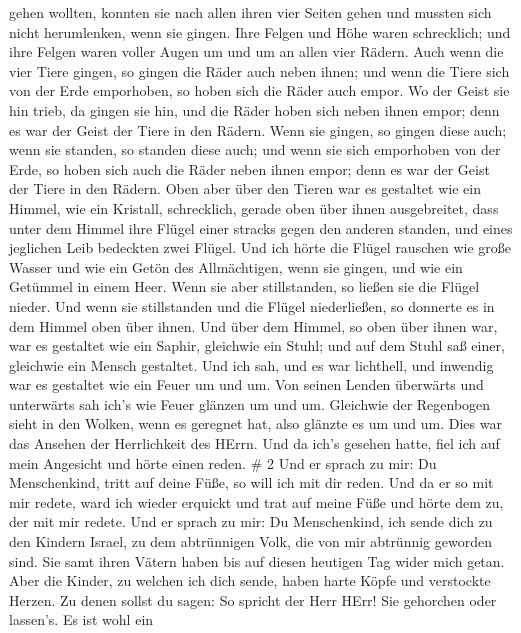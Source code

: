 gehen wollten, konnten sie nach allen ihren vier Seiten gehen und
mussten sich nicht herumlenken, wenn sie gingen.  Ihre
Felgen und Höhe waren schrecklich; und ihre Felgen waren voller Augen um
und um an allen vier Rädern.  Auch wenn die vier Tiere
gingen, so gingen die Räder auch neben ihnen; und wenn die Tiere sich
von der Erde emporhoben, so hoben sich die Räder auch empor.
 Wo der Geist sie hin trieb, da gingen sie hin, und die
Räder hoben sich neben ihnen empor; denn es war der Geist der Tiere in
den Rädern.  Wenn sie gingen, so gingen diese auch; wenn
sie standen, so standen diese auch; und wenn sie sich emporhoben von der
Erde, so hoben sich auch die Räder neben ihnen empor; denn es war der
Geist der Tiere in den Rädern.  Oben aber über den Tieren
war es gestaltet wie ein Himmel, wie ein Kristall, schrecklich, gerade
oben über ihnen ausgebreitet,  dass unter dem Himmel ihre
Flügel einer stracks gegen den anderen standen, und eines jeglichen Leib
bedeckten zwei Flügel.  Und ich hörte die Flügel rauschen
wie große Wasser und wie ein Getön des Allmächtigen, wenn sie gingen,
und wie ein Getümmel in einem Heer. Wenn sie aber stillstanden, so
ließen sie die Flügel nieder.  Und wenn sie stillstanden
und die Flügel niederließen, so donnerte es in dem Himmel oben über
ihnen.  Und über dem Himmel, so oben über ihnen war, war es
gestaltet wie ein Saphir, gleichwie ein Stuhl; und auf dem Stuhl saß
einer, gleichwie ein Mensch gestaltet.  Und ich sah, und es
war lichthell, und inwendig war es gestaltet wie ein Feuer um und um.
Von seinen Lenden überwärts und unterwärts sah ich's wie Feuer glänzen
um und um.  Gleichwie der Regenbogen sieht in den Wolken,
wenn es geregnet hat, also glänzte es um und um. Dies war das Ansehen
der Herrlichkeit des HErrn. Und da ich's gesehen hatte, fiel ich auf
mein Angesicht und hörte einen reden. \# 2  Und er sprach zu
mir: Du Menschenkind, tritt auf deine Füße, so will ich mit dir reden.
 Und da er so mit mir redete, ward ich wieder erquickt und
trat auf meine Füße und hörte dem zu, der mit mir redete. 
Und er sprach zu mir: Du Menschenkind, ich sende dich zu den Kindern
Israel, zu dem abtrünnigen Volk, die von mir abtrünnig geworden sind.
Sie samt ihren Vätern haben bis auf diesen heutigen Tag wider mich
getan.  Aber die Kinder, zu welchen ich dich sende, haben
harte Köpfe und verstockte Herzen. Zu denen sollst du sagen: So spricht
der Herr HErr!  Sie gehorchen oder lassen's. Es ist wohl ein
